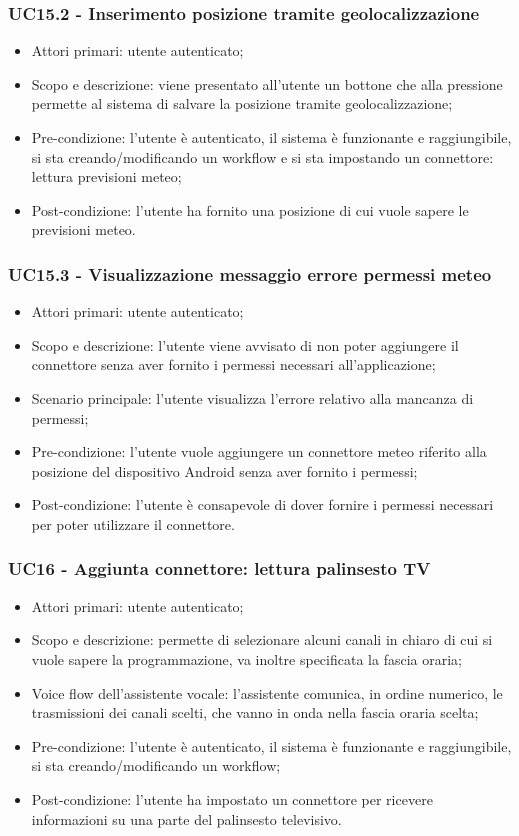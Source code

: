 \subsubsection{UC15.2 - Inserimento posizione tramite geolocalizzazione}
\begin{itemize}
	\item  Attori primari: utente autenticato;
	\item  Scopo e descrizione: viene presentato all'utente un bottone che alla pressione permette al sistema di salvare la posizione tramite geolocalizzazione;
	\item  Pre-condizione: l'utente è autenticato, il sistema è funzionante e raggiungibile, si sta creando/modificando un workflow e si sta impostando un connettore: lettura previsioni meteo;
	\item  Post-condizione: l'utente ha fornito una posizione di cui vuole sapere le previsioni meteo.
\end{itemize}
\subsubsection{UC15.3 - Visualizzazione messaggio errore permessi meteo}
\begin{itemize}
	\item  Attori primari: utente autenticato;
	\item  Scopo e descrizione: l'utente viene avvisato di non poter aggiungere il connettore senza aver fornito i permessi necessari all'applicazione;
	\item  Scenario principale: l'utente visualizza l'errore relativo alla mancanza di permessi;
	\item  Pre-condizione: l'utente vuole aggiungere un connettore meteo riferito alla posizione del dispositivo Android senza aver fornito i permessi;
	\item  Post-condizione: l'utente è consapevole di dover fornire i permessi necessari per poter utilizzare il connettore.
\end{itemize}
\subsubsection{UC16 - Aggiunta connettore: lettura palinsesto TV}
\begin{itemize}
	\item  Attori primari: utente autenticato;
	\item  Scopo e descrizione: permette di selezionare alcuni canali in chiaro di cui si vuole sapere la programmazione, va inoltre specificata la fascia oraria;
	\item  Voice flow dell'assistente vocale: l'assistente comunica, in ordine numerico, le trasmissioni dei canali scelti, che vanno in onda nella fascia oraria scelta;
	\item  Pre-condizione: l'utente è autenticato, il sistema è funzionante e raggiungibile, si sta creando/modificando un workflow;
	\item  Post-condizione: l'utente ha impostato un connettore per ricevere informazioni su una parte del palinsesto televisivo.
\end{itemize}
